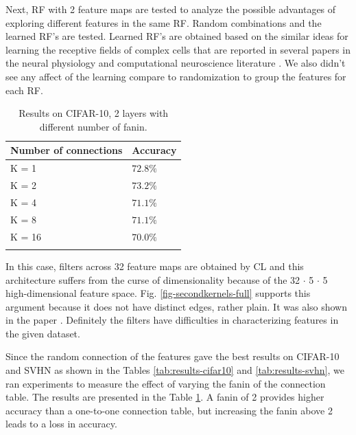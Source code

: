 \documentclass{article} %
\begin{document}
Next, RF with 2 feature maps are tested to analyze the possible advantages of exploring different features in the same RF.
Random combinations and the learned RF's are tested.
Learned RF's are obtained  based on the similar ideas for learning the receptive fields of complex cells that are reported in 
several papers in the neural physiology and computational neuroscience literature \cite{masquelier2007learning,spratling2005learning,wiskott2002slow,wallis1997invariant}.
We also didn't see any affect of the learning compare to randomization to group the features for each RF.

\setlength{\tabcolsep}{10pt}

\begin{table}
\caption{Results on CIFAR-10, 2 layers with different number of fanin.}
\begin{centering}
\begin{tabular}{ll}
\multicolumn{1}{c}{\bf Number of connections}  &\multicolumn{1}{c}{\bf Accuracy}\\
\hline
K = 1		&$72.8\%$\\
K = 2		&$73.2\%$\\
K = 4		&$71.1\%$\\
K = 8		&$71.1\%$\\
K = 16		&$70.0\%$\\
\hline
\label{tab:fanin}
\end{tabular}
\par %
\end{centering}

\end{table}

In this case, filters across 32 feature maps are obtained by CL and this architecture suffers from the curse of dimensionality
because of the 32 $\cdot$ 5 $\cdot$ 5 high-dimensional feature space.
Fig. \ref{fig-secondkernels-full} supports this argument because it does not have distinct edges, rather plain.
It was also shown in the paper  \cite{coates2012learning} .
Definitely the filters have difficulties in characterizing features in the given dataset.

Since the random connection of the features gave the best results on CIFAR-10 and SVHN as shown in the Tables \ref{tab:results-cifar10} and \ref{tab:results-svhn},
we ran experiments to measure the effect of varying the fanin of the connection table.
The results are presented in the Table \ref{tab:fanin}.
A fanin of 2 provides higher accuracy than a one-to-one connection table, but increasing the fanin above 2
leads to a loss in accuracy.
\end{document}
